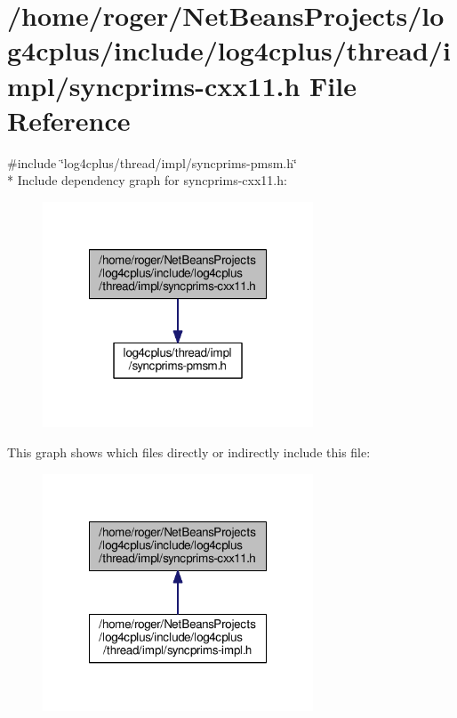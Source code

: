 \hypertarget{syncprims-cxx11_8h}{\section{/home/roger/\-Net\-Beans\-Projects/log4cplus/include/log4cplus/thread/impl/syncprims-\/cxx11.h File Reference}
\label{syncprims-cxx11_8h}
}
{\ttfamily \#include \char`\"{}log4cplus/thread/impl/syncprims-\/pmsm.\-h\char`\"{}}\\*
Include dependency graph for syncprims-\/cxx11.h\-:
\nopagebreak
\begin{figure}[H]
\begin{center}
\leavevmode
\includegraphics[width=228pt]{syncprims-cxx11_8h__incl}
\end{center}
\end{figure}
This graph shows which files directly or indirectly include this file\-:
\nopagebreak
\begin{figure}[H]
\begin{center}
\leavevmode
\includegraphics[width=228pt]{syncprims-cxx11_8h__dep__incl}
\end{center}
\end{figure}
